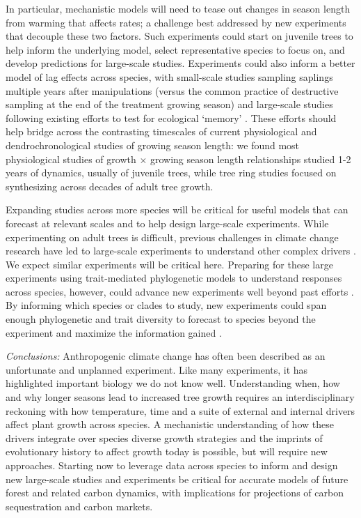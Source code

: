 \documentclass[11pt]{article}
\newcommand{\R}[1]{\label{#1}\linelabel{#1}}
\begin{document}
\R{R2rate3S}In particular, mechanistic models will need to tease out changes in season length from warming that affects rates; a challenge best addressed by new experiments that decouple these two factors. Such experiments could start on juvenile trees to help inform the underlying model, select representative species to focus on, and  develop predictions for large-scale studies. Experiments could also inform a better model of lag effects across species, with small-scale studies sampling saplings multiple years after manipulations (versus the common practice of destructive sampling at the end of the treatment growing season) and large-scale studies following existing efforts to test for ecological `memory'  \citep[e.g. ][]{flinker2021promise,schweiger2022transgenerational,chinmemory}. These efforts should help bridge across the contrasting timescales of current physiological and dendrochronological studies of growing season length: we found most physiological studies of growth $\times$ growing season length relationships studied 1-2 years of dynamics, usually of juvenile trees, while tree ring studies focused on synthesizing across decades of adult tree growth.\R{R2rate3E}

\R{R3complaint5S2}Expanding studies across more species will be critical for useful models that can forecast at relevant scales and to help design large-scale experiments. While experimenting on adult trees is difficult, previous challenges in climate change research have led to large-scale experiments to understand other complex drivers \citep[e.g. SPRUCE, DroughtNet, Pfynwald,][]{norby2011ecological,hanson2017attaining,smith2016drought}. We expect similar experiments will be critical here. Preparing for these large experiments using trait-mediated phylogenetic models to understand responses across species, however, could advance new experiments well beyond past efforts \citep{morales2024phylogenetic}. By informing which species or clades to study, new experiments could span enough phylogenetic and trait diversity to forecast to species beyond the experiment and maximize the information gained \citep{cadotte2017phylogenies}.\R{R3complaint1E}

\emph{Conclusions:} 
Anthropogenic climate change has often been described as an unfortunate and unplanned experiment. Like many experiments, it has highlighted important biology we do not know well. Understanding when, how and why longer seasons lead to increased tree growth requires an interdisciplinary reckoning with how temperature, time and a suite of external and internal drivers affect plant growth across species. A mechanistic understanding of how these drivers integrate over species diverse growth strategies and the imprints of evolutionary history to affect growth today is possible, but will require new approaches.  Starting now to leverage data across species to inform and design new large-scale studies and experiments be critical for accurate models of future forest and related carbon dynamics, with implications for projections of carbon sequestration and carbon markets. 
\end{document}
